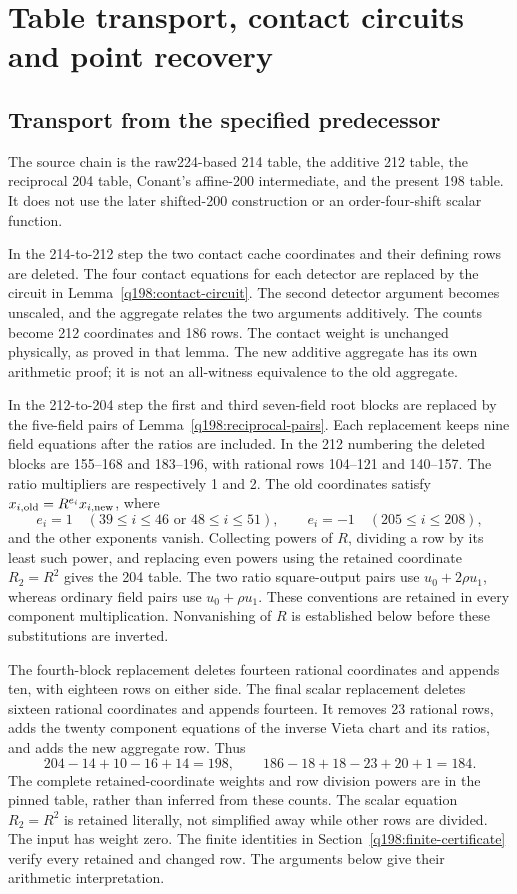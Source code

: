 \section{Table transport, contact circuits and point recovery}
\label{q198:table-transport}

\subsection{Transport from the specified predecessor}\label{q198:transport}
The source chain is the raw224-based 214 table, the additive 212 table,
the reciprocal 204 table, Conant's affine-200 intermediate, and the
present 198 table. It does not use the later shifted-200 construction
or an order-four-shift scalar function.

In the 214-to-212 step the two contact cache coordinates and their
defining rows are deleted. The four contact equations for each
detector are replaced by the circuit in Lemma~\ref{q198:contact-circuit}.
The second detector argument becomes unscaled, and the aggregate
relates the two arguments additively. The counts become 212 coordinates
and 186 rows. The contact weight is unchanged physically, as proved
in that lemma. The new additive aggregate has its own arithmetic
proof; it is not an all-witness equivalence to the old aggregate.

In the 212-to-204 step the first and third seven-field root blocks
are replaced by the five-field pairs of Lemma~\ref{q198:reciprocal-pairs}.
Each replacement keeps nine field equations after the ratios are
included. In the 212 numbering the deleted blocks are 155--168 and
183--196, with rational rows 104--121 and 140--157. The ratio
multipliers are respectively 1 and 2. The old coordinates satisfy
$x_{i,\rm old}=R^{e_i}x_{i,\rm new}$, where
\[
 e_i=1\quad(39\le i\le46\text{ or }48\le i\le51),\qquad
 e_i=-1\quad(205\le i\le208),
\]
and the other exponents vanish. Collecting powers of $R$, dividing
a row by its least such power, and replacing even powers using the
retained coordinate $R_2=R^2$ gives the 204 table. The two ratio
square-output pairs use $u_0+2\rho u_1$, whereas ordinary field pairs
use $u_0+\rho u_1$. These conventions are retained in every
component multiplication. Nonvanishing of $R$ is established below
before these substitutions are inverted.

The fourth-block replacement deletes fourteen rational coordinates
and appends ten, with eighteen rows on either side. The final scalar
replacement deletes sixteen rational coordinates and appends fourteen.
It removes 23 rational rows, adds the twenty component equations of
the inverse Vieta chart and its ratios, and adds the new aggregate
row. Thus
\[
 204-14+10-16+14=198,\qquad
 186-18+18-23+20+1=184.
\]
The complete retained-coordinate weights and row division powers
are in the pinned table, rather than inferred from these counts.
The scalar equation $R_2=R^2$ is retained literally, not simplified
away while other rows are divided. The input has weight zero.
The finite identities in Section~\ref{q198:finite-certificate}
verify every retained and changed row. The arguments below give
their arithmetic interpretation.

